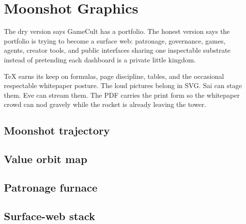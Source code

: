 \chapter{Moonshot Graphics}

The dry version says GameCult has a portfolio. The honest version says the portfolio is trying to become a surface web: patronage, governance, games, agents, creator tools, and public interfaces sharing one inspectable substrate instead of pretending each dashboard is a private little kingdom.

TeX earns its keep on formulas, page discipline, tables, and the occasional respectable whitepaper posture. The loud pictures belong in SVG. Sai can stage them. Eve can stream them. The PDF carries the print form so the whitepaper crowd can nod gravely while the rocket is already leaving the tower.

\section{Moonshot trajectory}


\section{Value orbit map}


\section{Patronage furnace}


\section{Surface-web stack}


